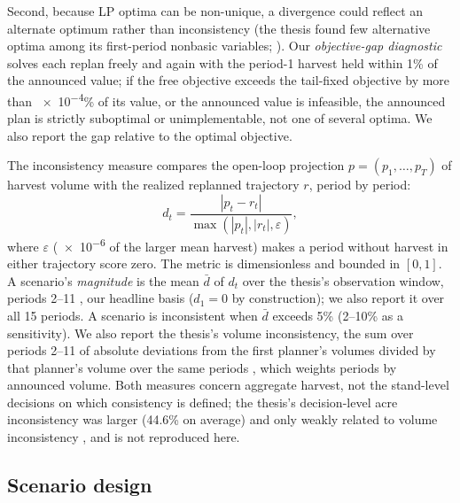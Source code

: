 Second, because LP optima can be non-unique, a divergence could reflect an alternate optimum rather than inconsistency (the thesis found few alternative optima among its first-period nonbasic variables; \citealp[p.~124]{daugherty1991credibility}). Our \emph{objective-gap diagnostic} solves each replan freely and again with the period-1 harvest held within 1\% of the announced value; if the free objective exceeds the tail-fixed objective by more than \num{e-4}\% of its value, or the announced value is infeasible, the announced plan is strictly suboptimal or unimplementable, not one of several optima. We also report the gap relative to the optimal objective.

The inconsistency measure compares the open-loop projection \(p = (p_1, \ldots, p_T)\) of harvest volume with the realized replanned trajectory \(r\), period by period:
\begin{equation}
d_t = \frac{|p_t - r_t|}{\max(|p_t|, |r_t|, \varepsilon)},
\label{eq:metric}
\end{equation}
where \(\varepsilon\) (\num{e-6} of the larger mean harvest) makes a period without harvest in either trajectory score zero. The metric is dimensionless and bounded in \([0, 1]\). A scenario's \emph{magnitude} is the mean \(\bar d\) of \(d_t\) over the thesis's observation window, periods 2--11 \citep[p.~83]{daugherty1991credibility}, our headline basis (\(d_1 = 0\) by construction); we also report it over all 15 periods. A scenario is inconsistent when \(\bar d\) exceeds 5\% (2--10\% as a sensitivity). We also report the thesis's volume inconsistency, the sum over periods 2--11 of absolute deviations from the first planner's volumes divided by that planner's volume over the same periods \citep[eq.~5-1]{daugherty1991credibility}, which weights periods by announced volume. Both measures concern aggregate harvest, not the stand-level decisions on which consistency is defined; the thesis's decision-level acre inconsistency was larger (44.6\% on average) and only weakly related to volume inconsistency \citep[\(R^2 = 0.40\);][pp.~93--94]{daugherty1991credibility}, and is not reproduced here.

\hypertarget{experiment-design}{%
\subsection{Scenario design}\label{experiment-design}}

